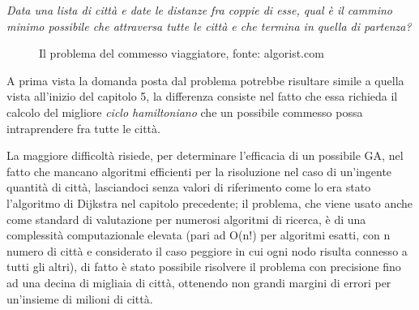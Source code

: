 \textit{Data una lista di citt\`a e date le distanze fra coppie di esse, qual \`e il cammino minimo possibile che attraversa tutte le citt\`a e che termina in quella di partenza?}
\vspace{3mm}
\begin{figure}[H]%
    \centering
    \caption{Il problema del commesso viaggiatore, fonte: algorist.com}
    \label{fig:tsp}%
\end{figure}
A prima vista la domanda posta dal problema potrebbe risultare simile a quella vista all'inizio del capitolo 5, la differenza consiste nel fatto che essa richieda il calcolo del migliore \textit{ciclo hamiltoniano} che un possibile commesso possa intraprendere fra tutte le citt\`a.

La maggiore difficolt\`a risiede, per determinare l'efficacia di un possibile GA, nel fatto che mancano algoritmi efficienti per la risoluzione nel caso di un'ingente quantit\`a di citt\`a, lasciandoci senza valori di riferimento come lo era stato l'algoritmo di Dijkstra nel capitolo precedente; il problema, che viene usato anche come standard di valutazione per numerosi algoritmi di ricerca, \`e di una complessit\`a computazionale elevata (pari ad O(n!) per algoritmi esatti, con n numero di citt\`a e considerato il caso peggiore in cui ogni nodo risulta connesso a tutti gli altri), di fatto \`e stato possibile risolvere il problema con precisione fino ad una decina di migliaia di citt\`a, ottenendo non grandi margini di errori per un'insieme di milioni di citt\`a.
\vspace{3mm}

